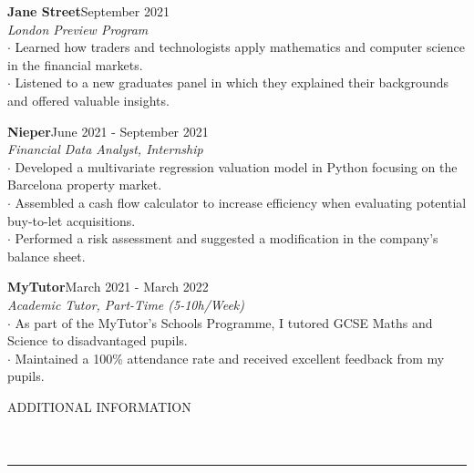 \documentclass[11pt]{article}
\begin{document}
\vspace{-0.6em}

\textbf{Jane Street}\hspace*{\fill}September 2021\\
\emph{London Preview Program}\smallskip\\
$\cdot$ Learned how traders and technologists apply mathematics and computer science in the financial markets.\\
$\cdot$ Listened to a new graduates panel in which they explained their backgrounds and offered valuable insights.\\

\vspace{-0.6em}

\textbf{Nieper}\hspace*{\fill}June 2021 - September 2021\\
\emph{Financial Data Analyst, Internship}\smallskip\\
$\cdot$ Developed a multivariate regression valuation model in Python focusing on the Barcelona property market.\\
$\cdot$ Assembled a cash flow calculator to increase efficiency when evaluating potential buy-to-let acquisitions.\\
$\cdot$ Performed a risk assessment and suggested a modification in the company’s balance sheet.\\

\vspace{-0.6em}

\textbf{MyTutor}\hspace*{\fill}March 2021 - March 2022\\
\emph{Academic Tutor, Part-Time (5-10h/Week)}\smallskip\\
$\cdot$ As part of the MyTutor’s Schools Programme, I tutored GCSE Maths and Science to disadvantaged pupils.\\
$\cdot$ Maintained a 100\% attendance rate and received excellent feedback from my pupils.\\

\vspace{-0.3em}

{\large ADDITIONAL INFORMATION}\\
\vspace{-1.5em}\\

\vspace{-1.5em}\\
\noindent\rule{\textwidth}{0.1pt}
\end{document}
